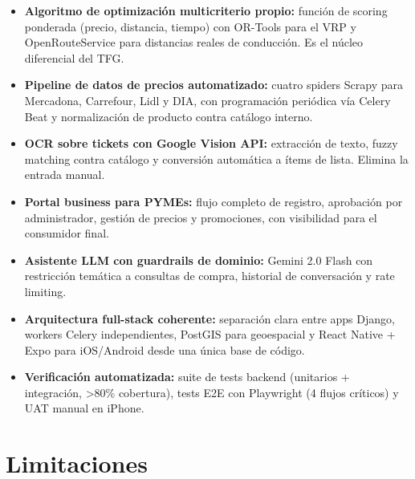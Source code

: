 \begin{itemize}
  \item \textbf{Algoritmo de optimizaci\'on multicriterio propio:} funci\'on de scoring ponderada
    (precio, distancia, tiempo) con OR-Tools para el VRP y OpenRouteService para distancias reales
    de conducci\'on. Es el n\'ucleo diferencial del TFG.

  \item \textbf{Pipeline de datos de precios automatizado:} cuatro spiders Scrapy para Mercadona,
    Carrefour, Lidl y DIA, con programaci\'on peri\'odica v\'ia Celery Beat y normalizaci\'on de
    producto contra cat\'alogo interno.

  \item \textbf{OCR sobre tickets con Google Vision API:} extracci\'on de texto, fuzzy matching
    contra cat\'alogo y conversi\'on autom\'atica a \'items de lista. Elimina la entrada manual.

  \item \textbf{Portal business para PYMEs:} flujo completo de registro, aprobaci\'on por
    administrador, gesti\'on de precios y promociones, con visibilidad para el consumidor final.

  \item \textbf{Asistente LLM con guardrails de dominio:} Gemini 2.0 Flash con restricci\'on
    tem\'atica a consultas de compra, historial de conversaci\'on y rate limiting.

  \item \textbf{Arquitectura full-stack coherente:} separaci\'on clara entre apps Django, workers
    Celery independientes, PostGIS para geoespacial y React Native + Expo para iOS/Android desde
    una \'unica base de c\'odigo.

  \item \textbf{Verificaci\'on automatizada:} suite de tests backend (unitarios + integraci\'on,
    \textgreater80\% cobertura), tests E2E con Playwright (4 flujos cr\'iticos) y UAT manual en
    iPhone.
\end{itemize}

\section{Limitaciones}\label{sec:limitaciones}

